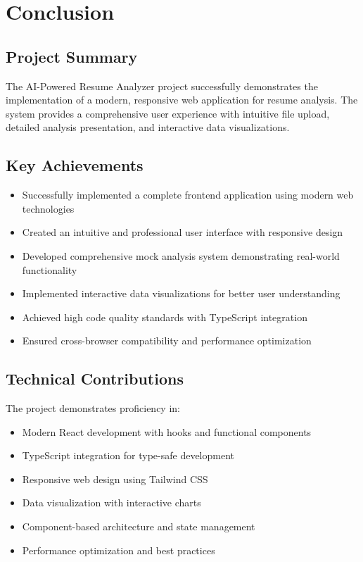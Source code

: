 \documentclass[12pt,a4paper]{article}
\begin{document}
\section{Conclusion}

\subsection{Project Summary}
The AI-Powered Resume Analyzer project successfully demonstrates the implementation of a modern, responsive web application for resume analysis. The system provides a comprehensive user experience with intuitive file upload, detailed analysis presentation, and interactive data visualizations.

\subsection{Key Achievements}
\begin{itemize}
    \item Successfully implemented a complete frontend application using modern web technologies
    \item Created an intuitive and professional user interface with responsive design
    \item Developed comprehensive mock analysis system demonstrating real-world functionality
    \item Implemented interactive data visualizations for better user understanding
    \item Achieved high code quality standards with TypeScript integration
    \item Ensured cross-browser compatibility and performance optimization
\end{itemize}

\subsection{Technical Contributions}
The project demonstrates proficiency in:
\begin{itemize}
    \item Modern React development with hooks and functional components
    \item TypeScript integration for type-safe development
    \item Responsive web design using Tailwind CSS
    \item Data visualization with interactive charts
    \item Component-based architecture and state management
    \item Performance optimization and best practices
\end{itemize}
\end{document}
